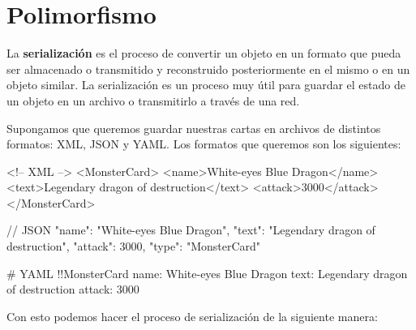 \section{Polimorfismo}
  \label{sec:oop:principios:clases_abstractas}

  La \textbf{serialización} es el proceso de convertir un objeto en un formato que pueda ser
  almacenado o transmitido y reconstruido posteriormente en el mismo o en un objeto similar.
  La serialización es un proceso muy útil para guardar el estado de un objeto en un archivo o
  transmitirlo a través de una red.

  Supongamos que queremos guardar nuestras cartas en archivos de distintos formatos: XML, JSON y
  YAML.
  Los formatos que queremos son los siguientes:

  \begin{xml}
    <!-- XML -->
    <MonsterCard>
      <name>White-eyes Blue Dragon</name>
      <text>Legendary dragon of destruction</text>
      <attack>3000</attack>
    </MonsterCard>
  \end{xml}

  \begin{json}
    // JSON
    {
      "name": "White-eyes Blue Dragon",
      "text": "Legendary dragon of destruction",
      "attack": 3000,
      "type": "MonsterCard"
    }
  \end{json}

  \begin{yaml}
    # YAML
    !!MonsterCard
    name: White-eyes Blue Dragon
    text: Legendary dragon of destruction
    attack: 3000
  \end{yaml}

  Con esto podemos hacer el proceso de serialización de la siguiente manera:


